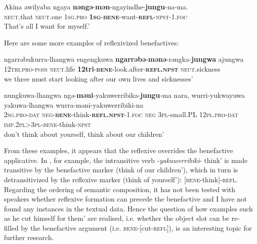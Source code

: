 \documentclass[output=paper]{langscibook}
\begin{document}
 \ex
 \label{ex:vanegmond:25b}
\gll Akina awilyaba ngaya \textbf{nəngə}{-}\textbf{mən}{-ngayindhe-}\textbf{jungu}-na-ma.\\
\textsc{neut}.that \textsc{neut}.one \textsc{1sg}.\textsc{pro} \textbf{\textsc{1sg}}-\textbf{\textsc{bene}}-want-\textbf{\textsc{refl}}-\textsc{npst}-1.\textsc{foc}\\
\glt That’s all I want for myself.’
\z
\z



Here are some more examples of reflexivized benefactives:



\ea%
 \label{ex:vanegmond:26}
\gll ngarrəbukurra-lhangwa engengkuwa \textbf{ngarrəbə}{-}\textbf{mənə}-rəngka-\textbf{jungwa} {ajungwa}\\
\textsc{12tri}.\textsc{pro}-\textsc{poss} \textsc{neut}.life \textbf{12tri}-\textbf{\textsc{bene}}-look.after-\textbf{\textsc{refl}}\textbf{.\textsc{npst}} \textsc{neut}.sickness\\
\glt we three must start looking after our own lives and sicknesses’
\z



\ea%
 \label{ex:vanegmond:27}
\gll nungkuwa-lhangwa ngə-\textbf{məni}-yakuwerribika-\textbf{jungu}-ma nara, wurri-yukwayuwa yakuwa-lhangwa wurra-məni-yakuwerribiki-na\\
\textsc{2sg}.\textsc{pro}-\textsc{dat} \textsc{neg}-\textbf{\textsc{bene}}-think-\textbf{\textsc{refl}}\textbf{.\textsc{npst}}-1.\textsc{foc} \textsc{neg} \textsc{3pl}-small.PL \textsc{12pl}.\textsc{pro}-\textsc{dat} \textsc{imp.2pl>3pl-bene}-think\textsc{-npst}\\
\glt don’t think about yourself, think about our children’
\z



From these examples, it appears that the reflexive overrides the benefactive applicative. In , for example, the intransitive verb -\textit{yakuwerribiki}- think’ is made transitive by the benefactive marker (think of our children’), which in turn is detransitivized by the reflexive marker (think of yourself’): [\textsc{bene}-think]-\textsc{refl}. Regarding the ordering of semantic composition, it has not been tested with speakers whether reflexive formation can precede the benefactive and I have not found any instances in the textual data. Hence the question of how examples such as he cut himself for them’ are realised, i.e. whether the object slot can be re-filled by the benefactive argument (i.e. \textsc{bene}-[cut-\textsc{refl}]), is an interesting topic for further research.
\end{document}
